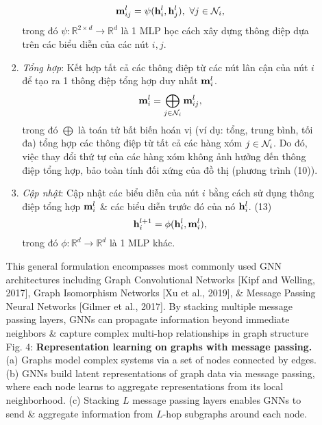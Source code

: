 \documentclass{article}
\begin{document}
\begin{itemize}
\begin{itemize}
\begin{enumerate}
            \begin{equation*}
                {\bf m}_{ij}^l = \psi({\bf h}_i^l,{\bf h}_j^l),\ \forall j\in{\cal N}_i,
            \end{equation*}
            trong đó $\psi:\mathbb{R}^{2\times d}\to\mathbb{R}^d$ là 1 MLP học cách xây dựng thông điệp dựa trên các biểu diễn của các nút $i,j$.
            \item {\it Tổng hợp}: Kết hợp tất cả các thông điệp từ các nút lân cận của nút $i$ để tạo ra 1 thông điệp tổng hợp duy nhất ${\bf m}_i^l$.
            \begin{equation*}
                {\bf m}_i^l = \bigoplus_{j\in{\cal N}_i} {\bf m}_{ij}^l,
            \end{equation*}
            trong đó $\bigoplus$ là toán tử bất biến hoán vị (ví dụ: tổng, trung bình, tối đa) tổng hợp các thông điệp từ tất cả các hàng xóm $j\in{\cal N}_i$. Do đó, việc thay đổi thứ tự của các hàng xóm không ảnh hưởng đến thông điệp tổng hợp, bảo toàn tính đối xứng của đồ thị (phương trình (10)).
            \item {\it Cập nhật}: Cập nhật các biểu diễn của nút $i$ bằng cách sử dụng thông điệp tổng hợp ${\bf m}_i^l$ \& các biểu diễn trước đó của nó ${\bf h}_i^l$. (13)
            \begin{equation*}
                {\bf h}_i^{l+1} = \phi({\bf h}_i^l,{\bf m}_i^l),
            \end{equation*}
            trong đó $\phi:\mathbb{R}^d\to\mathbb{R}^d$ là 1 MLP khác.
        \end{enumerate}
        This general formulation encompasses most commonly used GNN architectures including Graph Convolutional Networks [Kipf and Welling, 2017], Graph Isomorphism Networks [Xu et al., 2019], \& Message Passing Neural Networks [Gilmer et al., 2017]. By stacking multiple message passing layers, GNNs can propagate information beyond immediate neighbors \& capture complex multi-hop relationships in graph structure {\sf Fig. 4: {\bf Representation learning on graphs with message passing.} (a) Graphs model complex systems via a set of nodes connected by edges. (b) GNNs build latent representations of graph data via message passing, where each node learns to aggregate representations from its local neighborhood. (c) Stacking $L$ message passing layers enables GNNs to send \& aggregate information from $L$-hop subgraphs around each node.}


\end{itemize}
\end{itemize}
\end{document}
